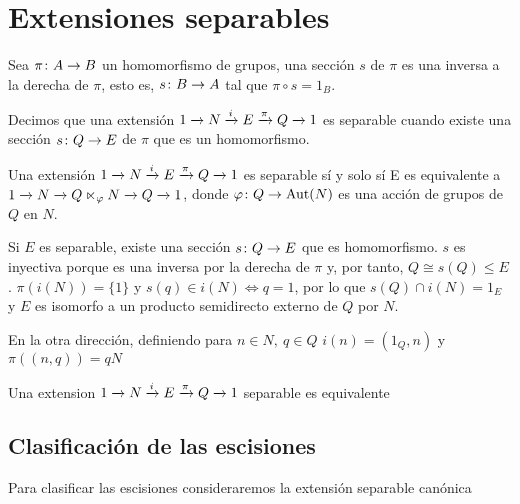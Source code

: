 
\section{Extensiones separables}\label{sec:split}

\begin{definicion} %
	Sea $\homo \pi A B$ un homomorfismo de grupos, una sección $s$ de $\pi$ es una inversa a la derecha de $\pi$, esto es, $\homo s B A$ tal que $\pi \circ s = 1_B$.
\end{definicion}

\begin{definicion}	
	Decimos que una extensión $\extension i \pi N E Q$ es separable cuando existe una sección $\homo s Q E$ de $\pi$ que es un homomorfismo.
\end{definicion}

\begin{teorema}\label{splitext}
	Una extensión $\extension i \pi N E Q$ es separable sí y solo sí E es equivalente a $\extension {} {} N {Q\ltimes_{\varphi} N} Q$, donde $\homo \varphi Q \Aut(N)$ es una acción de grupos de $Q$ en $N$. %
	\begin{demostracion}
		Si $E$ es separable, existe una sección $\homo s Q E$ que es homomorfismo. $s$ es inyectiva porque es una inversa por la derecha de $\pi$ y, por tanto, $Q\cong s(Q) \leq E$.
		$\pi (i(N)) = \{1\}$ y $s(q)\in i(N) \iff q = 1$, por lo que $s(Q)\cap i(N) = {1_E}$ y $E$ es isomorfo a un producto semidirecto externo de $Q$ por $N$.
		
		En la otra dirección, definiendo para $n\in N, \ q\in Q$ $i(n) = (1_Q,n)$ y $\pi((n,q)) = qN$ %
	\end{demostracion}
\end{teorema}

\begin{teorema}
	Una extension $\extension i \pi N E Q$ separable es equivalente
\end{teorema}
\subsection{Clasificación de las escisiones}

Para clasificar las escisiones consideraremos la extensión separable canónica 

